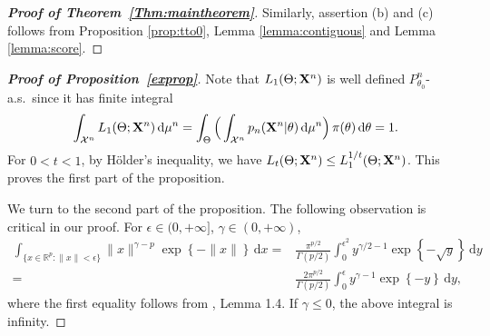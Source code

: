 \documentclass[11pt]{article}
\theoremstyle{plain}
\theoremstyle{definition}
\theoremstyle{remark}
\begin{document}
\begin{appendices}
\begin{proof}[\textbf{Proof of Theorem~\ref{Thm:maintheorem}}]
        Similarly, assertion (b) and (c) follows from Proposition \ref{prop:tto0}, Lemma \ref{lemma:contiguous} and Lemma \ref{lemma:score}.

    \end{proof}







\begin{proof}[\textbf{Proof of Proposition~\ref{exprop}}]

Note that $L_1(\Theta;\mathbf{X}^{n})$ is well defined $P_{\theta_0}^n$-a.s.\ since it has finite integral
$$
\int_{\mathcal{X}^n} L_1(\Theta;\mathbf{X}^{n}) \, \mathrm d \mu^n=
\int_{\Theta}\Big(\int_{\mathcal{X}^n} p_n(\mathbf{X}^{n}|\theta) \, \mathrm d \mu^n \Big) \, \pi(\theta)\, \mathrm d \theta=1.
$$
For $0<t<1$, by H\"older's inequality, we have $L_{t}(\Theta;\mathbf{X}^{n})\leq L_1^{1/t}(\Theta;\mathbf{X}^{n})$. This proves the first part of the proposition. 

We turn to the second part of the proposition.
The following observation is critical in our proof.
For $\epsilon \in (0, +\infty]$, $\gamma \in (0, +\infty)$,
\begin{equation}\label{eq:fang}
\begin{aligned}
    \int_{\{x\in\mathbb R^p : \|x\| < \epsilon \}}
\| x \|^{\gamma - p} \exp \left\{ - \| x \| \right\}
\,\mathrm d x
=
&
\frac{\pi^{p/2}}{\Gamma (p/2)} \int_{0}^{\epsilon^2}  y^{ \gamma/2 - 1 } \exp \left\{  - \sqrt{y} \right\} \, \mathrm d y
\\
=
&
\frac{ 2 \pi^{p/2}}{\Gamma (p/2)} \int_{0}^{\epsilon}  y^{ \gamma - 1 } \exp \left\{  - {y} \right\} \, \mathrm d y
,
\end{aligned}
\end{equation}
where the first equality follows from \cite{Fang1990}, Lemma 1.4.
If $\gamma \leq 0$, the above integral is infinity.


\end{proof}
\end{appendices}
\end{document}
